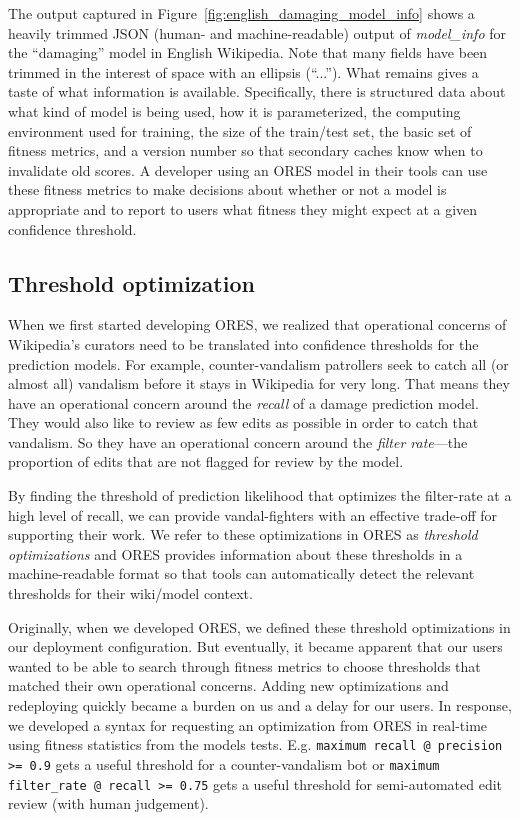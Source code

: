 The output captured in Figure~\ref{fig:english_damaging_model_info} shows a heavily trimmed JSON (human- and machine-readable) output of \emph{model\_info} for the ``damaging'' model in English Wikipedia.  Note that many fields have been trimmed in the interest of space with an ellipsis (``...'').  What remains gives a taste of what information is available.  Specifically, there is structured data about what kind of model is being used, how it is parameterized, the computing environment used for training, the size of the train/test set, the basic set of fitness metrics, and a version number so that secondary caches know when to invalidate old scores.  A developer using an ORES model in their tools can use these fitness metrics to make decisions about whether or not a model is appropriate and to report to users what fitness they might expect at a given confidence threshold.

\subsection{Threshold optimization}
\label{sec:appendix.threshold_optimization}
When we first started developing ORES, we realized that operational concerns of Wikipedia's curators need to be translated into confidence thresholds for the prediction models.  For example, counter-vandalism patrollers seek to catch all (or almost all) vandalism before it stays in Wikipedia for very long.  That means they have an operational concern around the \emph{recall} of a damage prediction model.  They would also like to review as few edits as possible in order to catch that vandalism.  So they have an operational concern around the \emph{filter rate}---the proportion of edits that are not flagged for review by the model\cite{halfaker2016notes}.

By finding the threshold of prediction likelihood that optimizes the filter-rate at a high level of recall, we can provide vandal-fighters with an effective trade-off for supporting their work.  We refer to these optimizations in ORES as \emph{threshold optimizations} and ORES provides information about these thresholds in a machine-readable format so that tools can automatically detect the relevant thresholds for their wiki/model context.

Originally, when we developed ORES, we defined these threshold optimizations in our deployment configuration.  But eventually, it became apparent that our users wanted to be able to search through fitness metrics to choose thresholds that matched their own operational concerns.  Adding new optimizations and redeploying quickly became a burden on us and a delay for our users.  In response, we developed a syntax for requesting an optimization from ORES in real-time using fitness statistics from the models tests. E.g. \texttt{maximum recall @ precision >= 0.9} gets a useful threshold for a counter-vandalism bot or \texttt{maximum filter\_rate @ recall >= 0.75} gets a useful threshold for semi-automated edit review (with human judgement).

